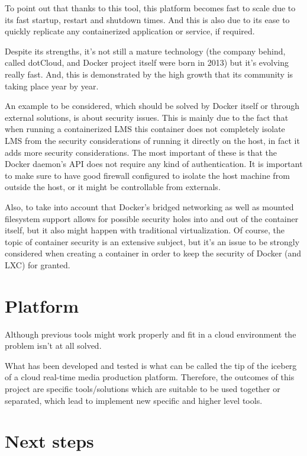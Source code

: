 To point out that thanks to this tool, this platform becomes fast to scale due to its fast startup, restart and shutdown times. And this is also due to its ease to quickly replicate any containerized application or service, if required. 

Despite its strengths, it's not still a mature technology (the company behind, called dotCloud, and Docker project itself were born in 2013) but it's evolving really fast. And, this is demonstrated by the high growth that its community is taking place year by year. 

An example to be considered, which should be solved by Docker itself or through external solutions, is about security issues. This is mainly due to the fact that when running a containerized LMS this container does not completely isolate LMS from the security considerations of running it directly on the host, in fact it adds more security considerations. The most important of these is that the Docker daemon's API does not require any kind of authentication. It is important to make sure to have good firewall configured to isolate the host machine from outside the host, or it might be controllable from externals. 

Also, to take into account that Docker's bridged networking as well as mounted filesystem support allows for possible security holes into and out of the container itself, but it also might happen with traditional virtualization. Of course, the topic of container security is an extensive subject, but it's an issue to be strongly considered when creating a container in order to keep the security of Docker (and LXC) for granted.

\section{Platform}

Although previous tools might work properly and fit in a cloud environment the problem isn't at all solved. 

What has been developed and tested is what can be called the tip of the iceberg of a cloud real-time media production platform. Therefore, the outcomes of this project are specific tools/solutions which are suitable to be used together or separated, which lead to implement new specific and higher level tools. 


\section{Next steps}

